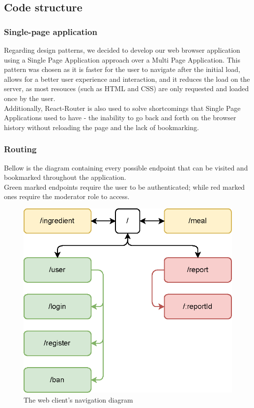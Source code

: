\subsection{Code structure}

\subsubsection{Single-page application}

Regarding design patterns, we decided to develop our web browser application using a Single Page Application approach over
a Multi Page Application. This pattern was chosen as it is faster for the user to navigate after the initial load, allows for
a better user experience and interaction, and it reduces the load on the server, as most resouces (such as HTML and CSS) are
only requested and loaded once by the user.\\

Additionally, React-Router is also used to solve shortcomings that Single Page Applications used to have -
the inability to go back and forth on the browser history without reloading the page and the lack of bookmarking.\\

\subsubsection{Routing}

Bellow is the diagram containing every possible endpoint that can be visited and bookmarked throughout the application.\\

Green marked endpoints require the user to be authenticated; while red marked ones require the moderator role to access.\\

\begin{figure}[H]
    \begin{center}
        \includegraphics[scale=0.7]{_figures/web-client-endpoints.eps}
        \caption{The web client's navigation diagram}
    \end{center}
\end{figure}

